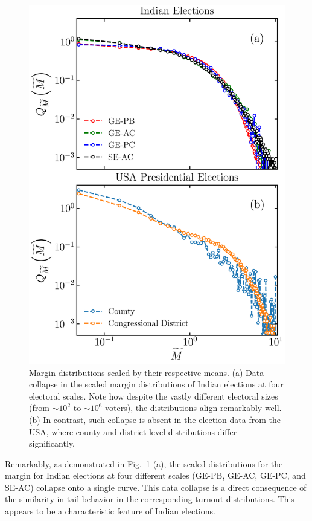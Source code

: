 \begin{figure}[H]
    \centering
    \includegraphics[width=1\linewidth]{chapters/chapter6/scaled_margin_dist_India_us.pdf}
    \caption{Margin distributions scaled by their respective means. (a) Data collapse in the scaled margin distributions of Indian elections at four electoral scales. Note how despite the vastly different electoral sizes (from $\sim 10^2$ to $\sim 10^6$ voters), the distributions align remarkably well. (b) In contrast, such collapse is absent in the election data from the USA, where county and district level distributions differ significantly.}
    \label{fig:margin_dist_india_us}
\end{figure}

Remarkably, as demonstrated in Fig.~\ref{fig:margin_dist_india_us} (a), the scaled distributions for the margin for Indian elections at four different scales (GE-PB, GE-AC, GE-PC, and SE-AC) collapse onto a single curve. This data collapse is a direct consequence of the similarity in tail behavior in the corresponding turnout distributions. This appears to be a characteristic feature of Indian elections.

